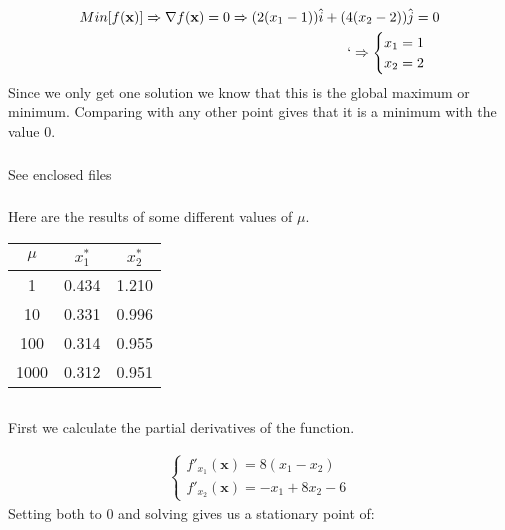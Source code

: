 \documentclass{article}
\begin{document}
\subsubsection{}
\begin{align*}
  Min[f(\mathbf{x})] \Rightarrow \nabla f(\mathbf{x}) = 0 \Rightarrow
  (2 (x_1 - 1)) \hat{i} + (4 (x_2 - 2)) \hat{j} = 0 \\`
  \Rightarrow
  \begin{cases}
    x_1 = 1 \\
    x_2 = 2
  \end{cases}
\end{align*}
Since we only get one solution we know that this is the global maximum or
minimum. Comparing with any other point gives that it is a minimum with the
value $0$.

\subsubsection{}
See enclosed files

\subsubsection{}
Here are the results of some different values of $\mu$.
\begin{tabular}{c | c | c}
  $\mu$ & $x_1^*$ & $x_2^*$ \\
  \hline
  1    & 0.434 & 1.210 \\
  10   & 0.331 & 0.996 \\
  100  & 0.314 & 0.955 \\
  1000 & 0.312 & 0.951
\end{tabular}

\subsection{}
\subsubsection{}

First we calculate the partial derivatives of the function.

\begin{align*}
  \begin{cases}
    f'_{x_1}(\mathbf{x}) = 8 (x_1 - x_2) \\
    f'_{x_2}(\mathbf{x}) = - x_1 + 8 x_2 - 6
  \end{cases}
\end{align*}
Setting both to $0$ and solving gives us a stationary point of:
\end{document}
